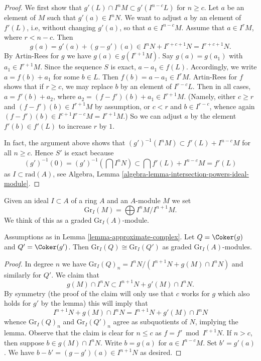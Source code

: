 \begin{proof}
We first show that $g'(L) \cap I^nM \subset g'(I^{n - c}L)$ for $n \geq c$.
Let $a$ be an element of $M$ such that $g'(a) \in I^nN$. We want to
adjust $a$ by an element of $f'(L)$, i.e, without changing $g'(a)$, so
that $a \in I^{n-c}M$. Assume that $a \in I^rM$, where $r < n - c$.
Then
$$
g(a) = g'(a) + (g - g')(a) \in
I^n N + I^{r + c + 1}N = I^{r + c + 1}N.
$$
By Artin-Rees for $g$ we have $g(a) \in g(I^{r + 1}M)$. Say $g(a) = g(a_1)$
with $a_1 \in I^{r + 1}M$. Since the sequence $S$ is exact, $a - a_1 \in f(L)$.
Accordingly, we write $a = f(b) + a_1$ for some $b \in L$.
Then $f(b) = a - a_1 \in I^rM$. Artin-Rees for $f$ shows that
if $r \geq c$, we may replace $b$ by an element of $I^{r - c}L$.
Then in all cases, $a = f'(b) + a_2$, where
$a_2 = (f - f')(b) + a_1 \in I^{r + 1}M$. (Namely, either $c \geq r$
and $(f - f')(b) \in I^{r + 1}M$ by assumption, or $c < r$ and
$b \in I^{r - c}$, whence again $(f - f')(b) \in I^{c + 1} I^{r - c} M =
I^{r + 1}M$.) So we can adjust $a$ by the element $f'(b) \in f'(L)$ to
increase $r$ by $1$.

\medskip\noindent
In fact, the argument above shows that
$(g')^{-1}(I^nM) \subset f'(L) + I^{n - c}M$ for all $n \geq c$.
Hence $S'$ is exact because
$$
(g')^{-1}(0) = (g')^{-1}(\bigcap I^nN) \subset
\bigcap f'(L) + I^{n - c}M = f'(L)
$$
as $I \subset \text{rad}(A)$, see Algebra, Lemma
\ref{algebra-lemma-intersection-powers-ideal-module}.
\end{proof}

\noindent
Given an ideal $I \subset A$ of a ring $A$ and an $A$-module $M$
we set
$$
\text{Gr}_I(M) = \bigoplus I^nM/I^{n + 1}M.
$$
We think of this as a graded $\text{Gr}_I(A)$-module.

\begin{lemma}
\label{lemma-approximate-complex-graded}
Assumptions as in Lemma \ref{lemma-approximate-complex}.
Let $Q = \Coker(g)$ and $Q' = \Coker(g')$. Then
$\text{Gr}_I(Q) \cong \text{Gr}_I(Q')$
as graded $\text{Gr}_I(A)$-modules.
\end{lemma}

\begin{proof}
In degree $n$ we have
$\text{Gr}_I(Q)_n = I^nN/(I^{n + 1}N + g(M) \cap I^nN)$
and similarly for $Q'$. We claim that
$$
g(M) \cap I^nN \subset I^{n + 1}N + g'(M) \cap I^nN.
$$
By symmetry (the proof of the claim will only use that $c$ works
for $g$ which also holds for $g'$ by the lemma) this will imply that
$$
I^{n + 1}N + g(M) \cap I^nN = I^{n + 1}N + g'(M) \cap I^nN
$$
whence $\text{Gr}_I(Q)_n$ and $\text{Gr}_I(Q')_n$ agree as subquotients
of $N$, implying the lemma. Observe that the claim is clear for
$n \leq c$ as $f = f' \bmod I^{c + 1}N$. If $n > c$, then suppose
$b \in g(M) \cap I^nN$. Write $b = g(a)$ for $a \in I^{n - c}M$.
Set $b' = g'(a)$. We have $b - b' = (g - g')(a) \in I^{n + 1}N$
as desired.
\end{proof}

